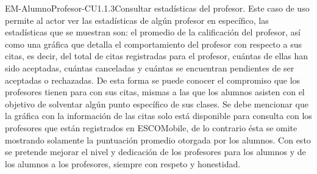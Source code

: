 \begin{UseCase}{EM-AlumnoProfesor-CU1.1.3}{Consultar estadísticas del profesor.}{
	\noindent
	Este caso de uso permite al actor ver las estadísticas de algún profesor en específico, las estadísticas que se muestran son: el promedio de la calificación del profesor, así como una gráfica que detalla el comportamiento del profesor con respecto a sus citas, es decir, del total de citas registradas para el profesor, cuántas de ellas han sido aceptadas, cuántas canceladas y cuántas se encuentran pendientes de ser aceptadas o rechazadas. De esta forma se puede conocer el compromiso que los profesores tienen para con sus citas, mismas a las que los alumnos asisten con el objetivo de solventar algún punto específico de sus clases. Se debe mencionar que la gráfica con la información de las citas solo está disponible para consulta con los profesores que están registrados en ESCOMobile, de lo contrario ésta se omite mostrando solamente la puntuación promedio otorgada por los alumnos. Con esto se pretende mejorar el nivel y dedicación de los profesores para los alumnos y de los alumnos a los profesores, siempre con respeto y honestidad.
	\newline
	}
\end{UseCase}

